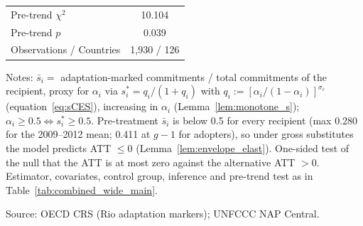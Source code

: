 \begin{table}[H]
{\begin{tabular}{lc}
Pre-trend $\chi^2$ & 10.104 \\
Pre-trend $p$ & 0.039 \\
\midrule
Observations / Countries & 1,930 / 126 \\
\bottomrule
\end{tabular}
}
\par\vspace{4pt}
\begin{minipage}{\linewidth}\footnotesize
Notes: $\bar s_i = $ adaptation-marked commitments / total commitments of the recipient, proxy for $\alpha_i$ via $s_i^*=q_i/(1+q_i)$ with $q_i:=[\alpha_i/(1-\alpha_i)]^{\sigma_c}$ (equation~\eqref{eq:sCES}), increasing in $\alpha_i$ (Lemma~\ref{lem:monotone_s}); $\alpha_i \geq 0.5 \iff s_i^* \geq 0.5$. Pre-treatment $\bar s_i$ is below 0.5 for every recipient (max 0.280 for the 2009--2012 mean; 0.411 at $g-1$ for adopters), so under gross substitutes the model predicts ATT $\leq 0$ (Lemma~\ref{lem:envelope_elast}). One-sided test of the null that the ATT is at most zero against the alternative ATT $>0$. Estimator, covariates, control group, inference and pre-trend test as in Table~\ref{tab:combined_wide_main}.\par
Source: OECD CRS (Rio adaptation markers); UNFCCC NAP Central.
\end{minipage}
\end{table}
